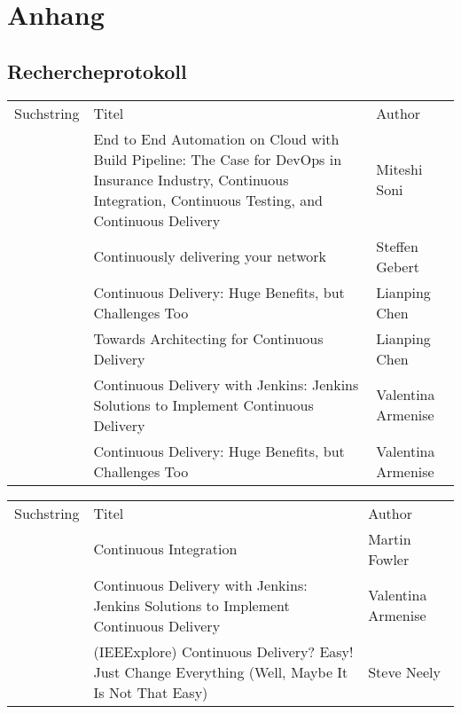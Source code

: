 \chapter{Anhang}
\label{chap:anhang}



\section{Rechercheprotokoll}
\label{sec:rechercheprotokoll}

\begin{tabular}{|l|L{10cm}|l|}
\hline
     \\ \hline
    Suchstring & Titel & Author \\ \hline
     & End to End Automation on Cloud with Build Pipeline: The Case for DevOps in Insurance Industry, Continuous Integration, Continuous Testing, and Continuous Delivery & Miteshi Soni \\ \hline
     & Continuously delivering your network & Steffen Gebert \\ \hline
     & Continuous Delivery: Huge Benefits, but Challenges Too & Lianping Chen \\ \hline
     & Towards Architecting for Continuous Delivery & Lianping Chen \\ \hline
    
     & Continuous Delivery with Jenkins: Jenkins Solutions to Implement Continuous Delivery & Valentina Armenise \\ \hline
     & Continuous Delivery: Huge Benefits, but Challenges Too & Valentina Armenise \\ \hline
\end{tabular} 

\begin{tabular}{|l|L{10cm}|l|} \hline
      \\ \hline
    Suchstring & Titel & Author \\ \hline
     & Continuous Integration & Martin Fowler \\ \hline
    
     & Continuous Delivery with Jenkins: Jenkins Solutions to Implement Continuous Delivery & Valentina Armenise \\ \hline
     &  (IEEExplore) Continuous Delivery? Easy! Just Change Everything (Well, Maybe It Is Not That Easy) & Steve Neely \\ \hline
\end{tabular} 

